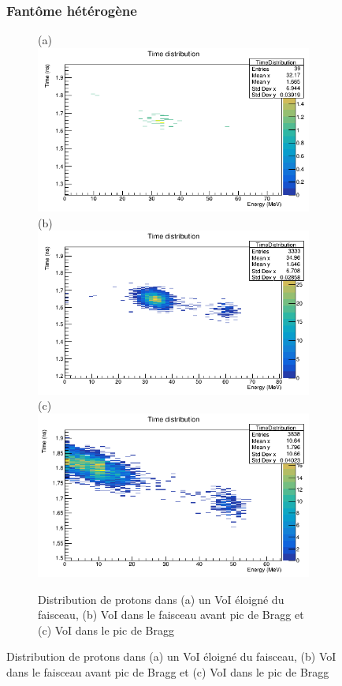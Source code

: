 \documentclass[11pt,a4paper,oldfontcommands]{memoir}
\begin{document}
\begin{figure}
\begin{figure}[h!]
\end{figure}{}


\subsubsection{Fantôme hétérogène}
\begin{figure}[h!]

\centering
\subfloat(a){\includegraphics[scale=0.3]{Parodi/away.png}}
\subfloat(b){\includegraphics[scale=0.3]{Parodi/preBragg.png}}\\
\subfloat(c){\includegraphics[scale=0.3]{Parodi/Bragg.png}}
\caption{ Distribution de protons dans (a) un VoI éloigné du faisceau, (b) VoI dans le faisceau avant pic de Bragg et (c) VoI dans le pic de Bragg }
\label{hetero prot}
\end{figure}


\end{figure}
\end{document}
